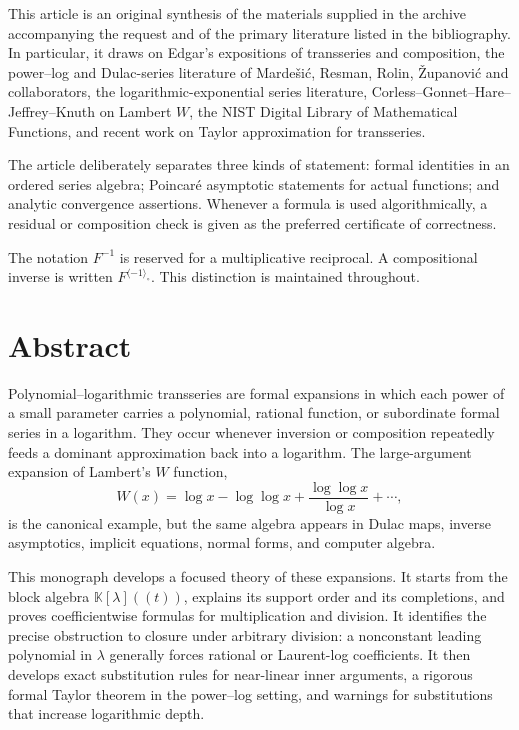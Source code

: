 \documentclass[11pt,openany]{book}
\theoremstyle{definition}
\theoremstyle{plain}
\theoremstyle{remark}
\newcommand{\K}{\mathbb{K}}
\newcommand{\invcomp}{^{\langle -1\rangle_{\circ}}}
\begin{document}
\thispagestyle{empty}
\vspace*{\fill}
\begin{center}
\begin{minipage}{0.84\textwidth}
\small
This article is an original synthesis of the materials supplied in the archive accompanying the request and of the primary literature listed in the bibliography. In particular, it draws on Edgar's expositions of transseries and composition, the power--log and Dulac-series literature of Marde\v{s}i\'c, Resman, Rolin, \v{Z}upanovi\'c and collaborators, the logarithmic-exponential series literature, Corless--Gonnet--Hare--Jeffrey--Knuth on Lambert \(W\), the NIST Digital Library of Mathematical Functions, and recent work on Taylor approximation for transseries.

\medskip
The article deliberately separates three kinds of statement: formal identities in an ordered series algebra; Poincar\'e asymptotic statements for actual functions; and analytic convergence assertions. Whenever a formula is used algorithmically, a residual or composition check is given as the preferred certificate of correctness.

\medskip
The notation \(F^{-1}\) is reserved for a multiplicative reciprocal. A compositional inverse is written \(F\invcomp\). This distinction is maintained throughout.
\end{minipage}
\end{center}
\vspace*{\fill}
\cleardoublepage

\chapter*{Abstract}
Polynomial--logarithmic transseries are formal expansions in which each power of a small parameter carries a polynomial, rational function, or subordinate formal series in a logarithm. They occur whenever inversion or composition repeatedly feeds a dominant approximation back into a logarithm. The large-argument expansion of Lambert's \(W\) function,
\[
 W(x)=\log x-\log\log x+\frac{\log\log x}{\log x}+\cdots,
\]
is the canonical example, but the same algebra appears in Dulac maps, inverse asymptotics, implicit equations, normal forms, and computer algebra.

This monograph develops a focused theory of these expansions. It starts from the block algebra \(\K[\lambda]((t))\), explains its support order and its completions, and proves coefficientwise formulas for multiplication and division. It identifies the precise obstruction to closure under arbitrary division: a nonconstant leading polynomial in \(\lambda\) generally forces rational or Laurent-log coefficients. It then develops exact substitution rules for near-linear inner arguments, a rigorous formal Taylor theorem in the power--log setting, and warnings for substitutions that increase logarithmic depth.
\end{document}
